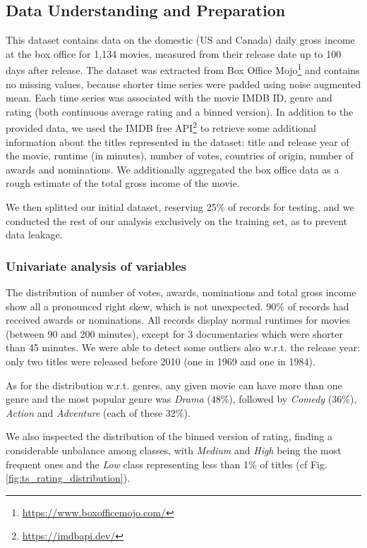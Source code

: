 \subsection{Data Understanding and Preparation}\label{sec:ts_preparation}
This dataset contains data on the domestic (US and Canada) daily gross income at the box office for 1,134 movies, measured from their release date up to 100 days after release.
The dataset was extracted from Box Office Mojo\footnote{\url{https://www.boxofficemojo.com/}} and contains no missing values, because shorter time series were padded using noise augmented mean.
Each time series was associated with the movie IMDB ID, genre and rating (both continuous average rating and a binned version).
In addition to the provided data, we used the IMDB free API\footnote{\url{https://imdbapi.dev/}} to retrieve some additional information about the titles represented in the dataset: title and release year of the movie, runtime (in minutes), number of votes, countries of origin, number of awards and nominations.
We additionally aggregated the box office data as a rough estimate of the total gross income of the movie.

We then splitted our initial dataset, reserving 25\% of records for testing, and we conducted the rest of our analysis exclusively on the training set, as to prevent data leakage.

\subsubsection{Univariate analysis of variables}
The distribution of number of votes, awards, nominations and total gross income show all a pronounced right skew, which is not unexpected. 90\% of records had received awards or nominations.
All records display normal runtimes for movies (between 90 and 200 minutes), except for 3 documentaries which were shorter than 45 minutes.
We were able to detect some outliers also w.r.t. the release year: only two titles were released before 2010 (one in 1969 and one in 1984).

As for the distribution w.r.t. genres, any given movie can have more than one genre and the most popular genre was \emph{Drama} (48\%), followed by \emph{Comedy} (36\%), \emph{Action} and \emph{Adventure} (each of these 32\%).

We also inspected the distribution of the binned version of rating, finding a considerable unbalance among classes, with \emph{Medium} and \emph{High} being the most frequent ones and the \emph{Low} class representing less than 1\% of titles (cf Fig. \ref{fig:ts_rating_distribution}).

